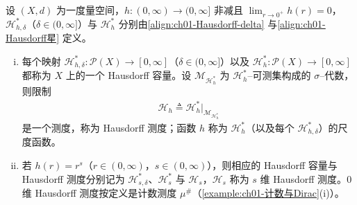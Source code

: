 \documentclass[../../main.tex]{subfiles}%
\begin{document}
\begin{definition}\label{definition:ch01-Hausdorff测度}
设 $(X,d)$ 为一度量空间，$h:(0,\infty)\to(0,\infty]$ 非减且 $\lim_{r\to0^+}h(r)=0$，$\mathcal{H}_{h,\delta}^*$（$\delta\in(0,\infty]$）与 $\mathcal{H}_h^*$ 分别由\eqref{align:ch01-Hausdorff-delta} 与\eqref{align:ch01-Hausdorff星} 定义。
\begin{enumerate}[(i)]
\item 每个映射 $\mathcal{H}_{h,\delta}^*:\mathcal{P}(X)\to[0,\infty]$（$\delta\in(0,\infty]$）以及 $\mathcal{H}_h^*:\mathcal{P}(X)\to[0,\infty]$ 都称为 $X$ 上的一个 Hausdorff 容量。设 $\mathcal{M}_{\mathcal{H}_h^*}$ 为 $\mathcal{H}_h^*$--可测集构成的 $\sigma$--代数，则限制
\begin{align*}
\mathcal{H}_h\triangleq \mathcal{H}_h^*|_{\mathcal{M}_{\mathcal{H}_h^*}}
\end{align*}
是一个测度，称为 Hausdorff 测度；函数 $h$ 称为 $\mathcal{H}_h^*$（以及每个 $\mathcal{H}_{h,\delta}^*$）的尺度函数。
\item 若 $h(r)=r^s$（$r\in(0,\infty)$，$s\in(0,\infty)$），则相应的 Hausdorff 容量与 Hausdorff 测度分别记为 $\mathcal{H}_{s,\delta}^*$、$\mathcal{H}_s^*$ 与 $\mathcal{H}_s$，$\mathcal{H}_s$ 称为 $s$ 维 Hausdorff 测度。$0$ 维 Hausdorff 测度按定义是计数测度 $\mu^\#$（\cref{example:ch01-计数与Dirac}(i)）。
\end{enumerate}
\end{definition}
\end{document}
